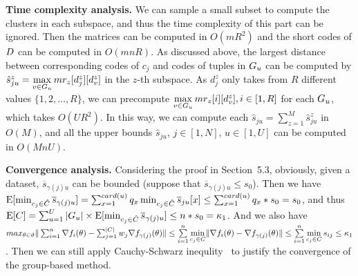  
 
 
 \noindent \textbf{Time complexity analysis.}
 We can sample a small subset to compute the clusters in each subspace, and thus the time complexity of this part can be ignored. 
 Then the matrices can be computed in $O(mR^2)$ and the short codes of $D$ can be computed in $O(mnR)$. 
 As discussed above,  the largest distance between corresponding codes of  $c_j$ and codes of tuples in $G_u$ can be computed by $\hat{s}_{ju}^z = \max\limits_{v\in G_u}mr_z[d_{j}^z][d_v^z]$ in the $z$-th subspace. 
 As $d_j^z$ only takes from $R$ different values $\{1, 2, \dots, R\}$, we can precompute $\max\limits_{v\in G_u}mr_z[i][d_v^z], i\in[1, R]$ for each $G_u$, which takes $O(UR^2)$. In this way, we can compute each $\hat{s}_{ju}=\sum_{z=1}^{M}\hat{s}^z_{ju}$ in $O(M)$, and all the upper bounds $\hat{s}_{ju}$, $j\in [1,N]$, $u\in [1,U]$ can be computed in  $O(MnU)$.%
 
\noindent \textbf{Convergence analysis.}  
Considering the proof in Section~5.3, 
obviously, given a dataset, $\overline{s}_{\gamma(j)u}$ can be bounded (suppose that $\overline{s}_{\gamma(j)u} \leq s_{0}$). Then we have
$\mathrm{E}[\min_{c_j\in \hat{C}}\overline{s}_{\gamma(j)u}] = \sum_{x=1}^{card(u)} q_x \min_{c_j \in \hat{C}} \overline{s}_{ju}[x] \leq \sum_{x= 1}^{card(u)} q_x * s_{0} = s_{0}$, and thus  $\mathrm{E}[C] = \sum_{u=1}^U  |G_u| \times\mathrm{E}[\min_{c_j\in \hat{C}}\overline{s}_{\gamma(j)u}] \leq n * s_{0} = \kappa_1$. And we also have $max_{\theta \in \vartheta} \Vert \sum_{i=1}^{n} \nabla f_{i}(\theta) - \sum_{j=1}^{\vert C \vert} w_j \nabla f_{\gamma(j)}(\theta) \Vert \leq \sum\limits_{i=1}^n \min \limits_{c_j\in C}\lVert \nabla f_i(\theta) - \nabla f_{\gamma(j)}(\theta) \rVert \leq \sum\limits_{i=1}^n \min \limits_{c_j\in C} s_{ij}  \leq \kappa_1$.
Then we can still apply Cauchy-Schwarz inequlity~\cite{strang2006linear} to justify the convergence of the group-based method.
 
